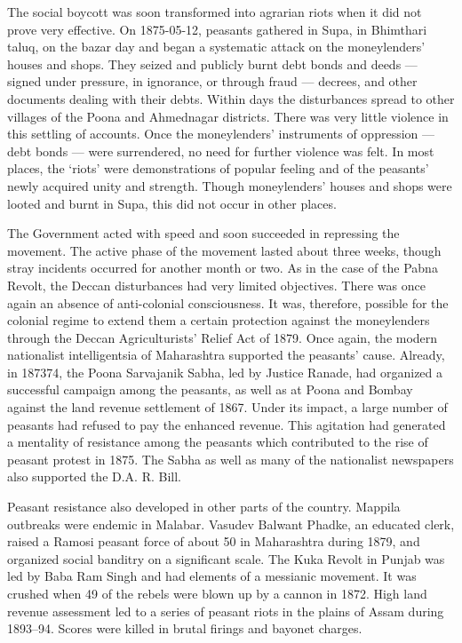 \begin{multicols}{2}
The social boycott was soon transformed into agrarian riots when it did not prove very effective. On 1875-05-12, peasants gathered in Supa, in Bhimthari taluq, on the bazar day and began a systematic attack on the moneylenders' houses and shops. They seized and publicly burnt debt bonds and deeds --- signed under pressure, in ignorance, or through fraud --- decrees, and other documents dealing with their debts. Within days the disturbances spread to other villages of the Poona and Ahmednagar districts. There was very little violence in this settling of accounts. Once the moneylenders' instruments of oppression --- debt bonds --- were surrendered, no need for further violence was felt. In most places, the `riots' were demonstrations of popular feeling and of the peasants' newly acquired unity and strength. Though moneylenders' houses and shops were looted and burnt in Supa, this did not occur in other places.

The Government acted with speed and soon succeeded in repressing the movement. The active phase of the movement lasted about three weeks, though stray incidents occurred for another month or two. As in the case of the Pabna Revolt, the Deccan disturbances had very limited objectives. There was once again an absence of anti-colonial consciousness. It was, therefore, possible for the colonial regime to extend them a certain protection against the moneylenders through the Deccan Agriculturists' Relief Act of 1879. Once again, the modern nationalist intelligentsia of Maharashtra supported the peasants' cause. Already, in 1873­74, the Poona Sarvajanik Sabha, led by Justice Ranade, had organized a successful campaign among the peasants, as well as at Poona and Bombay against the land revenue settlement of 1867. Under its impact, a large number of peasants had refused to pay the enhanced revenue. This agitation had generated a mentality of resistance among the peasants which contributed to the rise of peasant protest in 1875. The Sabha as well as many of the nationalist newspapers also supported the D.A. R. Bill.

Peasant resistance also developed in other parts of the country. Mappila outbreaks were endemic in Malabar. Vasudev Balwant Phadke, an educated clerk, raised a Ramosi peasant force of about 50 in Maharashtra during 1879, and organized social banditry on a significant scale. The Kuka Revolt in Punjab was led by Baba Ram Singh and had elements of a messianic movement. It was crushed when 49 of the rebels were blown up by a cannon in 1872. High land revenue assessment led to a series of peasant riots in the plains of Assam during 1893--94. Scores were killed in brutal firings and bayonet charges.


\end{multicols}
